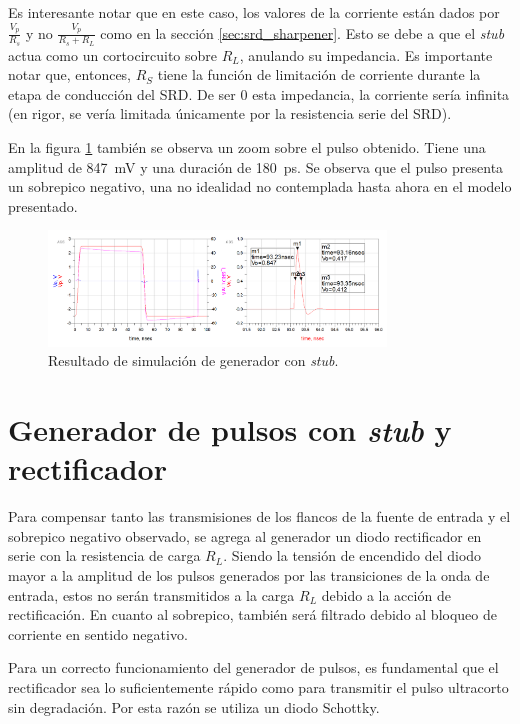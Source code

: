 Es interesante notar que en este caso, los valores de la corriente están dados
por $\frac{V_p}{R_s}$ y no $\frac{V_p}{R_s+R_L}$ como en la sección
\ref{sec:srd_sharpener}. Esto se debe a que el \textit{stub} actua como un
cortocircuito sobre $R_L$, anulando su impedancia. Es importante notar que,
entonces, $R_S$ tiene la función de limitación de corriente durante la etapa
de conducción del SRD. De ser $0$ esta impedancia, la corriente sería infinita
(en rigor, se vería limitada únicamente por la resistencia serie del SRD).

En la figura \ref{fig:stub_generator_sim_result} también se observa un zoom sobre el
pulso obtenido. Tiene una amplitud de \qty{847}{\milli\volt} y una duración de
\qty{180}{\pico\second}. Se observa que el pulso presenta un sobrepico negativo,
una no idealidad no contemplada hasta ahora en el modelo presentado.

\begin{figure}[t!]
    \centering
    \includegraphics[width=0.8\textwidth]{images/stub_generator_sim_result.png}
    \caption{Resultado de simulación de generador con \textit{stub}.}
    \label{fig:stub_generator_sim_result}
\end{figure}

\section{Generador de pulsos con \textit{stub} y rectificador}

Para compensar tanto las transmisiones de los flancos de la fuente de entrada y
el sobrepico negativo observado, se agrega al generador un diodo rectificador en
serie con la resistencia de carga $R_L$. Siendo la tensión de encendido del
diodo mayor a la amplitud de los pulsos generados por las transiciones de la
onda de entrada, estos no serán transmitidos a la carga $R_L$ debido a la acción
de rectificación. En cuanto al sobrepico, también será filtrado debido al
bloqueo de corriente en sentido negativo.

Para un correcto funcionamiento del generador de pulsos, es fundamental que el
rectificador sea lo suficientemente rápido como para transmitir el pulso
ultracorto sin degradación. Por esta razón se utiliza un diodo Schottky.

